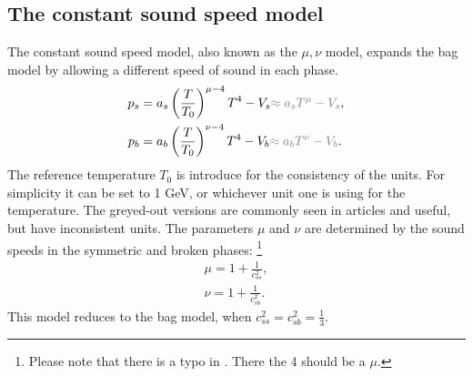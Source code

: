 \subsection{The constant sound speed model}
The constant sound speed model, also known as the $\mu, \nu$ model,
expands the bag model by allowing a different speed of sound in each phase.
\cites[eq. 15]{giese_2021}[eq. 38]{giese_2020}
\begin{align}
p_s &= a_s \left( \frac{T}{T_0} \right)^{\mu-4} T^4 - V_s {\color{gray} \approx a_s T^\mu - V_s }, \\
p_b &= a_b \left( \frac{T}{T_0} \right)^{\nu-4} T^4 - V_b {\color{gray} \approx a_b T^\nu - V_b}.
\end{align}
The reference temperature $T_0$ is introduce for the consistency of the units.
For simplicity it can be set to 1 GeV, or whichever unit one is using for the temperature.
The greyed-out versions are commonly seen in articles and useful, but have inconsistent units.
The parameters $\mu$ and $\nu$ are determined by the sound speeds in the symmetric and broken phases:
\cites[eq. 16]{giese_2021}[eq. 39]{giese_2020}
\footnote{Please note that there is a typo in \cite[eq. 15]{giese_2021}. There the 4 should be a $\mu$.}
\begin{align}
\mu = 1 + \frac{1}{c_{ss}^2}, \\
\nu = 1 + \frac{1}{c_{sb}^2}.
\end{align}
This model reduces to the bag model,
when $c_{ss}^2 = c_{sb}^2 = \frac{1}{3}$.

